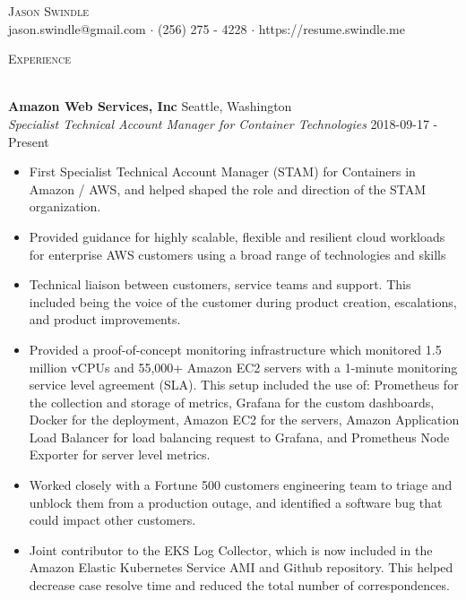 \documentclass[a4paper]{article}
\newcommand{\lineunder} {
    \vspace*{-8pt} \\
    \hspace*{-18pt} \hrulefill \\
}
\newcommand{\header} [1] {
    {\hspace*{-18pt}\vspace*{6pt} \textsc{#1}}
    \vspace*{-6pt} \lineunder
}
\begin{document}
\vspace*{-40pt}

\vspace*{-10pt}
\begin{center}
    {\Huge \scshape {Jason Swindle}}\\[1\baselineskip]
    jason.swindle@gmail.com $\cdot$ (256) 275 - 4228 $\cdot$ https://resume.swindle.me\\[1\baselineskip]
\end{center}

\header{Experience}
\vspace{1mm}

\textbf{Amazon Web Services, Inc} \hfill Seattle, Washington\\
\textit{Specialist Technical Account Manager for Container Technologies} \hfill 2018-09-17 - Present\\
\vspace{-1mm}
\begin{itemize} \itemsep 1pt
    \item First Specialist Technical Account Manager (STAM) for Containers in Amazon / AWS, and helped shaped the role and direction of the STAM organization.
    \item Provided guidance for highly scalable, flexible and resilient cloud workloads for enterprise AWS customers using a broad range of technologies and skills
    \item Technical liaison between customers, service teams and support. This included being the voice of the customer during product creation, escalations, and product improvements.
    \item Provided a proof-of-concept monitoring infrastructure which monitored 1.5 million vCPUs and 55,000+ Amazon EC2 servers with a 1-minute monitoring service level agreement (SLA). This setup included the use of: Prometheus for the collection and storage of metrics, Grafana for the custom dashboards, Docker for the deployment, Amazon EC2 for the servers, Amazon Application Load Balancer for load balancing request to Grafana, and Prometheus Node Exporter for server level metrics.
    \item Worked closely with a Fortune 500 customer\textsc{}s engineering team to triage and unblock them from a production outage, and identified a software bug that could impact other customers.
    \item Joint contributor to the \textquotedbl{}EKS Log Collector\textquotedbl{}, which is now included in the Amazon Elastic Kubernetes Service AMI and Github repository. This helped decrease case resolve time and reduced the total number of correspondences.
\end{itemize}
\end{document}
